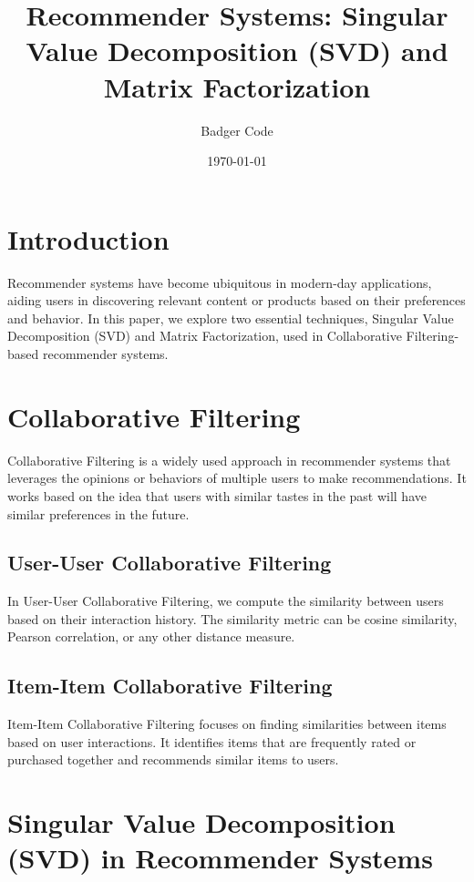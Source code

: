 \documentclass{article}
\begin{document}
\title{Recommender Systems: Singular Value Decomposition (SVD) and Matrix Factorization}
\author{Badger Code}
\date{\today}
\maketitle

\section{Introduction}

Recommender systems have become ubiquitous in modern-day applications, aiding users in discovering relevant content or products based on their preferences and behavior. In this paper, we explore two essential techniques, Singular Value Decomposition (SVD) and Matrix Factorization, used in Collaborative Filtering-based recommender systems.

\section{Collaborative Filtering}

Collaborative Filtering is a widely used approach in recommender systems that leverages the opinions or behaviors of multiple users to make recommendations. It works based on the idea that users with similar tastes in the past will have similar preferences in the future.

\subsection{User-User Collaborative Filtering}

In User-User Collaborative Filtering, we compute the similarity between users based on their interaction history. The similarity metric can be cosine similarity, Pearson correlation, or any other distance measure.

\subsection{Item-Item Collaborative Filtering}

Item-Item Collaborative Filtering focuses on finding similarities between items based on user interactions. It identifies items that are frequently rated or purchased together and recommends similar items to users.

\section{Singular Value Decomposition (SVD) in Recommender Systems}
\end{document}
